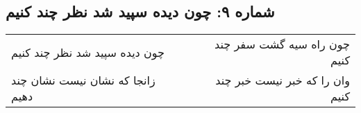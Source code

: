 \begin{center}
\section*{شماره ۹: چون دیده سپید شد نظر چند کنیم}
\label{sec:009}
\begin{longtable}{l p{0.5cm} r}
چون دیده سپید شد نظر چند کنیم
&&
چون راه سیه گشت سفر چند کنیم
\\
زانجا که نشان نیست نشان چند دهیم
&&
وان را که خبر نیست خبر چند کنیم
\\
\end{longtable}
\end{center}
